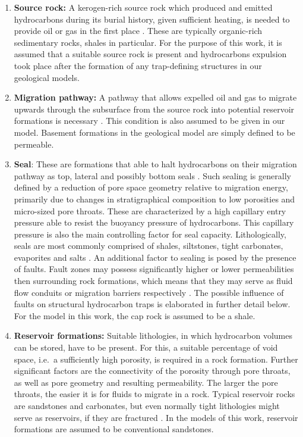         \begin{enumerate}
        	\item \textbf{Source rock:} A kerogen-rich source rock which produced and emitted hydrocarbons during its burial history, given sufficient heating, is needed to provide oil or gas in the first place \citep{dolson2016basics, selley2014elements}. These are typically organic-rich sedimentary rocks, shales in particular. For the purpose of this work, it is assumed that a  suitable source rock is present and hydrocarbons expulsion took place after the formation of any trap-defining structures in our geological models.
        	\item \textbf{Migration pathway:} A pathway that allows expelled oil and gas to migrate upwards through the subsurface from the source rock into potential reservoir formations is necessary \citep{dolson2016basics,north1985petroleum, selley2014elements}. This condition is also assumed to be given in our model. Basement formations in the geological model are simply defined to be permeable.
        	\item \textbf{Seal}: These are formations that able to halt hydrocarbons on their migration pathway as top, lateral and possibly bottom seals \citep{dolson2016basics, sorkhabi2005place}. Such sealing is generally defined by a reduction of pore space geometry relative to migration energy, primarily due to changes in stratigraphical composition to low porosities and micro-sized pore throats. These are characterized by a high capillary entry pressure able to resist the buoyancy pressure of hydrocarbons. This capillary pressure is also the main controlling factor for seal capacity. Lithologically, seals are most commonly comprised of shales, siltstones, tight carbonates, evaporites and salts \citep{dolson2016basics, dolson2016quantifying, sorkhabi2005place}. An additional factor to sealing is posed by the presence of faults. Fault zones may possess significantly higher or lower permeabilities then surrounding rock formations, which means that they may serve as fluid flow conduits or migration barriers respectively \citep{van2003lateral, sorkhabi2005place}. The possible influence of faults on structural hydrocarbon traps is elaborated in further detail below. For the model in this work, the cap rock is assumed to be a shale.
        	\item \textbf{Reservoir formations:} Suitable lithologies, in which hydrocarbon volumes can be stored, have to be present. For this, a suitable percentage of void space, i.e.\ a sufficiently high porosity, is required in a rock formation. Further significant factors are the connectivity of the porosity through pore throats, as well as pore geometry and resulting permeability. The larger the pore throats, the easier it is for fluids to migrate in a rock. Typical reservoir rocks are sandstones and carbonates, but even normally tight lithologies might serve as reservoirs, if they are fractured \citep{dolson2016basics, sorkhabi2005place, north1985petroleum, selley2014elements}. In the models of this work, reservoir formations are assumed to be conventional sandstones.

\end{enumerate}
